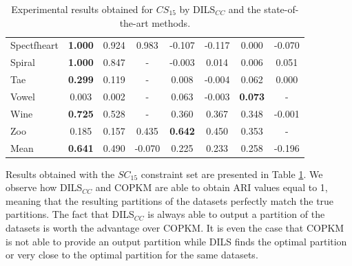\documentclass[review]{elsarticle}
\begin{document}
\begin{table}[!h]
{\begin{tabular}{lccccccc}
			Spectfheart & \textbf{1.000} & 0.924 & 0.983 & -0.107 & -0.117 & 0.000 & -0.070 \\
			Spiral & \textbf{1.000} & 0.847 & - & -0.003 & 0.014 & 0.006 & 0.051 \\
			Tae & \textbf{0.299} & 0.119 & - & 0.008 & -0.004 & 0.062 & 0.000 \\
			Vowel & 0.003 & 0.002 & - & 0.063 & -0.003 & \textbf{0.073} & - \\
			Wine & \textbf{0.725} & 0.528 & - & 0.360 & 0.367 & 0.348 & -0.001 \\
			Zoo & 0.185 & 0.157 & 0.435 & \textbf{0.642} & 0.450 & 0.353 & - \\
			\hline
			Mean & \textbf{0.641} & 0.490 & -0.070 & 0.225 & 0.233 & 0.258 & -0.196 \\
			\hline
			
		\end{tabular}}
		
	\caption{Experimental results obtained for $CS_{15}$ by DILS$_{CC}$ and the state-of-the-art methods.}
	\label{tab:results15}
\end{table}

Results obtained with the $SC_{15}$ constraint set are presented in Table \ref{tab:results15}. We observe how DILS$_{CC}$ and COPKM are able to obtain ARI values equal to 1, meaning that the resulting partitions of the datasets perfectly match the true partitions. The fact that DILS$_{CC}$ is always able to output a partition of the datasets is worth the advantage over COPKM. It is even the case that COPKM is not able to provide an output partition while DILS finds the optimal partition or very close to the optimal partition for the same datasets.
\end{document}
